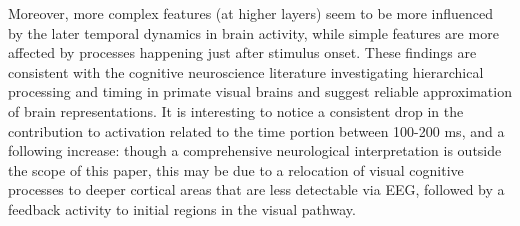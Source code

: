 \documentclass[10pt,journal,compsoc,twocolumn]{IEEEtran}
\begin{document}
Moreover, more complex features (at higher layers) seem to be more influenced by the later temporal dynamics in brain activity, while simple features are more affected by processes happening just after stimulus onset. These findings are consistent with the cognitive neuroscience literature investigating hierarchical processing and timing in primate visual brains and suggest reliable approximation of brain representations. It is interesting to notice a consistent drop in the contribution to activation related to the time portion between 100-200 ms, and a following increase: though a comprehensive neurological interpretation is outside the scope of this paper, this may be due to a relocation of visual cognitive processes to deeper cortical areas that are less detectable via EEG, followed by a feedback activity to initial regions in the visual pathway.
\end{document}
